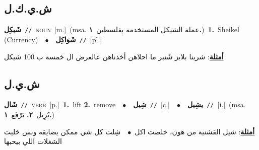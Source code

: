 \documentclass[10pt,a4paper,twoside]{article} %
\begin{document}
\begin{multicols}{2}
\vspace{-3mm}
\subsection*{\color{blue}\foreignlanguage{arabic}{ش.ي.ك.ل}\color{blue}{ (ntws)}} 

{\setlength\topsep{0pt}\textbf{\foreignlanguage{arabic}{شَيكِل}}\ {\color{gray}\texttt{//}\color{black}}\ \textsc{noun}\ [m.]\ \color{gray}(msa. \foreignlanguage{arabic}{عملة الشيكل المستخدمة بفلسطين}~\foreignlanguage{arabic}{\textbf{١.}})\color{black}\ \textbf{1.}~Sheikel (Currency)\ \ $\bullet$\ \ \setlength\topsep{0pt}\textbf{\foreignlanguage{arabic}{شَوَاكِل}}\ {\color{gray}\texttt{//}\color{black}}\ [pl.]\  \begin{flushright}\color{gray}\foreignlanguage{arabic}{\textbf{\underline{\foreignlanguage{arabic}{أمثلة}}}: شرينا بلايز شَنبر ما احلاهن أخذناهن عالعرض ال خمسة ب 100 شيكل}\end{flushright}\color{black}} \vspace{2mm}

\vspace{-3mm}
\subsection*{\color{blue}\foreignlanguage{arabic}{ش.ي.ل}\color{blue}{}} 

{\setlength\topsep{0pt}\textbf{\foreignlanguage{arabic}{شَال}}\ {\color{gray}\texttt{//}\color{black}}\ \textsc{verb}\ [p.]\ \textbf{1.}~lift  \textbf{2.}~remove\ \ $\bullet$\ \ \setlength\topsep{0pt}\textbf{\foreignlanguage{arabic}{شِيل}}\ {\color{gray}\texttt{//}\color{black}}\ [c.]\ \ $\bullet$\ \ \setlength\topsep{0pt}\textbf{\foreignlanguage{arabic}{يشِيل}}\ {\color{gray}\texttt{//}\color{black}}\ [i.]\ \color{gray}(msa. \foreignlanguage{arabic}{يُزِيل}~\foreignlanguage{arabic}{\textbf{٢.}}  \foreignlanguage{arabic}{يَرْفَع}~\foreignlanguage{arabic}{\textbf{١.}})\color{black}\  \begin{flushright}\color{gray}\foreignlanguage{arabic}{\textbf{\underline{\foreignlanguage{arabic}{أمثلة}}}: شيل القشنية من هون، خلصت اكل\ $\bullet$\ \  شِلت كل شي ممكن يضايقه وبس خليت الشغلات اللي بيحبها}\end{flushright}\color{black}} \vspace{2mm}


\end{multicols}
\end{document}
